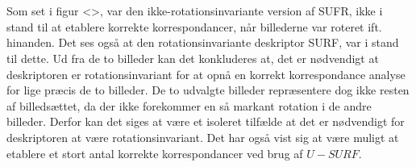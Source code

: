 \\ \\
Som set i figur <>, var den ikke-rotationsinvariante version af SUFR, ikke i stand til at etablere korrekte korrespondancer, når billederne var roteret ift. hinanden. Det ses også at den rotationsinvariante deskriptor SURF, var i stand til dette. Ud fra de to billeder kan det konkluderes at, det er nødvendigt at deskriptoren er rotationsinvariant for at opnå en korrekt korrespondance analyse for lige præcis de to billeder. De to udvalgte billeder repræsentere  dog ikke resten af billedsættet, da der ikke forekommer en så markant rotation i de andre billeder. Derfor kan det siges at være et isoleret tilfælde at det er nødvendigt for deskriptoren at være rotationsinvariant. Det har også vist sig at være muligt at etablere et stort antal korrekte korrespondancer ved brug af $U-SURF$.
